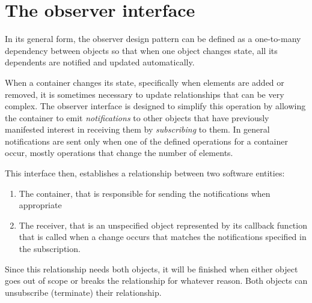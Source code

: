 \documentclass[12pt,a4paper]{memoir} %
\newcommand{\container}{}
\begin{document}
\section{The observer interface}
\renewcommand{\container}{Observer}
In its general form, the observer design pattern can be defined as a one-to-many dependency between objects so that when one object 
changes state, all its dependents are notified and updated automatically. 

When a container changes its state, specifically when elements are added or removed, it is sometimes necessary to update relationships that 
can be very complex.
The observer interface is designed to simplify this operation by allowing the container to emit \textsl{notifications} to other objects that have 
previously manifested interest in receiving them by \textsl{subscribing} to them. In general notifications are sent only when one of the defined
operations for a container occur, mostly operations that change the number of elements.

This interface then, establishes a relationship between two software entities:
\begin{enumerate}
\item The container, that is responsible for sending the notifications when appropriate
\item The receiver, that is an unspecified object represented by its callback function that is called when a change occurs that matches the
notifications specified in the subscription.
\end{enumerate}

Since this relationship needs both objects, it will be finished when either object goes out of scope or breaks the relationship for whatever 
reason. Both objects can unsubscribe (terminate) their relationship.
\end{document}
